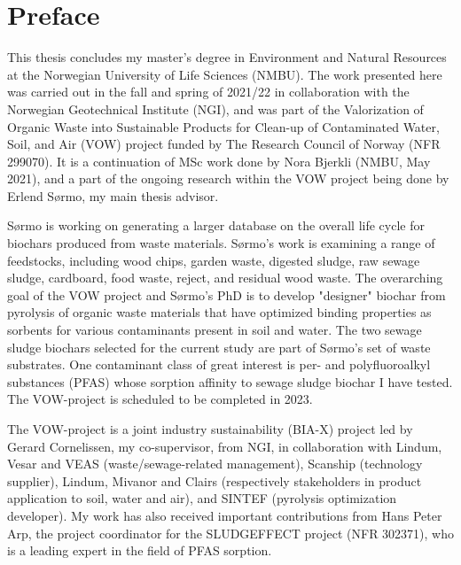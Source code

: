 \newpage
{}
\section*{Preface}
This thesis concludes my master's degree in Environment and Natural Resources at the Norwegian University of Life Sciences (NMBU). The work presented here was carried out in the fall and spring of 2021/22 in collaboration with the Norwegian Geotechnical Institute (NGI), and was part of the Valorization of Organic Waste into Sustainable Products for Clean-up of Contaminated Water, Soil, and Air (VOW) project funded by The Research Council of Norway (NFR 299070). It is a continuation of MSc work done by Nora Bjerkli (NMBU, May 2021), and a part of the ongoing research within the VOW project being done by Erlend S\o rmo, my main thesis advisor. 

S\o rmo is working on generating a larger database on the overall life cycle for biochars produced from waste materials. S\o rmo's work is examining a range of feedstocks, including wood chips, garden waste, digested sludge, raw sewage sludge, cardboard, food waste, reject, and residual wood waste. The overarching goal of the VOW project and S\o rmo's PhD is to develop "designer" biochar from pyrolysis of organic waste materials that have optimized binding properties as sorbents for various contaminants present in soil and water. The two sewage sludge biochars selected for the current study are part of S\o rmo's set of waste substrates. One contaminant class of great interest is per- and polyfluoroalkyl substances (PFAS) whose sorption affinity to sewage sludge biochar I have tested. The VOW-project is scheduled to be completed in 2023.

The VOW-project is a joint industry sustainability (BIA-X) project led by Gerard Cornelissen, my co-supervisor, from NGI, in collaboration with Lindum, Vesar and VEAS (waste/sewage-related management), Scanship (technology supplier), Lindum, Mivanor and Clairs (respectively stakeholders in product application to soil, water and air), and SINTEF (pyrolysis optimization developer). My work has also received important contributions from Hans Peter Arp, the project coordinator for the SLUDGEFFECT project (NFR 302371), who is a leading expert in the field of PFAS sorption.

